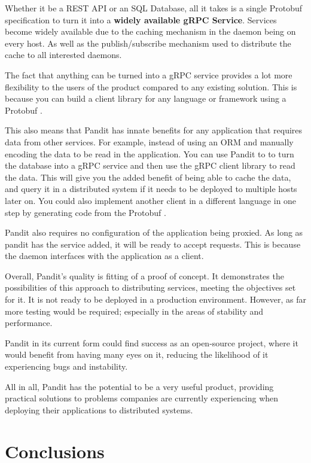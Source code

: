 \documentclass[a4paper,12pt]{report}
\begin{document}
Whether it be a REST API or an SQL Database, all it takes is a single Protobuf specification \cite{protobuf} to turn it into a
\textbf{widely available gRPC \cite{grpc} Service}. Services become widely available due to the caching mechanism in the daemon being on every host.
As well as the publish/subscribe mechanism used to distribute the cache to all interested daemons.

The fact that anything can be turned into a gRPC service provides a lot more flexibility to the users of the product compared to any existing solution.
This is because you can build a client library for any language or framework using a Protobuf \cite{codegen}.

This also means that Pandit has innate benefits for any application that requires data from other services.
For example, instead of using an ORM \cite{orm} and manually encoding the data to be read in the application. You can use Pandit to
to turn the database into a gRPC service and then use the gRPC client library to read the data. This will give you the added benefit of
being able to cache the data, and query it in a distributed system if it needs to be deployed to multiple hosts later on.
You could also implement another client in a different language in one step by generating code from the Protobuf \cite{codegen}.

Pandit also requires no configuration of the application being proxied. As long as pandit has the service added, it will be ready to accept requests.
This is because the daemon interfaces with the application as a client.

Overall, Pandit's quality is fitting of a proof of concept. 
It demonstrates the possibilities of this approach to distributing services, meeting the objectives set for it.
It is not ready to be deployed in a production environment. However, as far more testing would be required; especially in the areas of stability and performance.

Pandit in its current form could find success as an open-source project, where it would benefit from having many eyes on it, reducing the likelihood of it experiencing bugs and instability.

All in all, Pandit has the potential to be a very useful product, providing practical solutions to problems companies are currently experiencing when deploying their applications to distributed systems.

\chapter{Conclusions}
\end{document}
